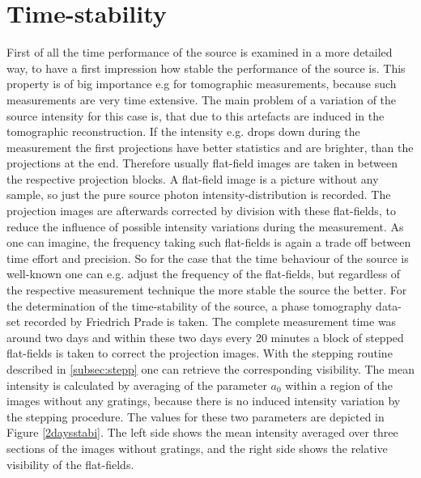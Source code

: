 \section{Time-stability}\label{sec:time}
First of all the time performance of the source is examined in a more detailed way, to have a first impression how stable the performance of the source is. 
This property is of big importance e.g for tomographic measurements, because such measurements are very time extensive. The main problem of a variation of the source intensity for this case is, that due to this artefacts are induced in the tomographic reconstruction. If the intensity e.g. drops down during the measurement the first projections have better statistics and are brighter, than the projections at the end. Therefore usually flat-field images are taken in between the respective projection blocks. A flat-field image is a picture without any sample, so just the pure source photon intensity-distribution is recorded. The projection images are afterwards corrected by division with these flat-fields, to reduce the influence of possible intensity variations during the measurement. As one can imagine, the frequency taking such flat-fields is again a trade off between time effort and precision. So for the case that the time behaviour of the source is well-known one can e.g. adjust the frequency of the flat-fields, but regardless of the respective measurement technique the more stable the source the better. For the determination of the time-stability of the source, a phase tomography data-set recorded by Friedrich Prade is taken. The complete measurement time was around two days and within these two days every 20 minutes a block of stepped flat-fields is taken to correct the projection images. With the stepping routine described in \ref{subsec:stepp} one can retrieve the corresponding visibility. The mean intensity is calculated by averaging of the parameter $a_{0}$ within a region of the images without any gratings, because there is no induced intensity variation by the stepping procedure. The values for these two parameters are depicted in Figure \ref{2daysstabi}. The left side shows the mean intensity averaged over three sections of the images without gratings, and the right side shows the relative visibility of the flat-fields.       
